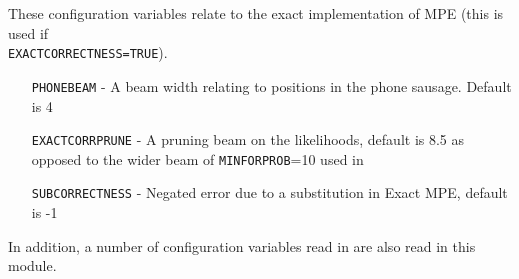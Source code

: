 These configuration variables relate to the exact implementation of MPE (this is
used if \\{\tt EXACTCORRECTNESS=TRUE}).
\begin{itemize}
\item[\texttt{PHONEBEAM}] - A beam width relating to positions in the phone sausage.  Default is 4
\item[\texttt{EXACTCORRPRUNE}] - A pruning beam on the likelihoods, default is 8.5  as opposed to the 
 wider beam of \texttt{MINFORPROB}=10 used in 
\item[\texttt{SUBCORRECTNESS}] - Negated error due to a substitution in Exact MPE, default is -1

\end{itemize}
In addition, a number of configuration variables read in  are also read in 
this module.





